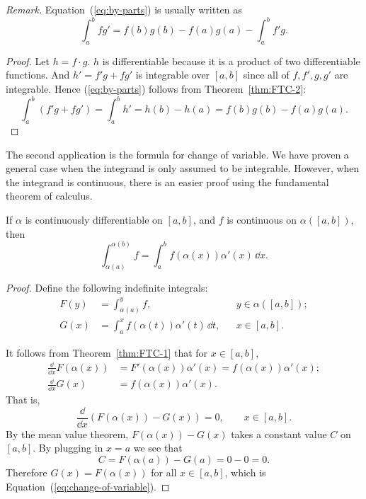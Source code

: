\noindent\textit{Remark.} Equation~(\ref{eq:by-parts}) is usually written as
\[
  \int_a^b f g' = f(b)g(b) - f(a)g(a) - \int_a^b f' g.
\]

\begin{proof}
  Let $h = f \cdot g$. $h$ is differentiable because it is a product of two differentiable functions.
  And $h' = f'g + fg'$ is integrable over $[a,b]$ since all of $f, f', g, g'$ are integrable.
  Hence (\ref{eq:by-parts}) follows from Theorem~\ref{thm:FTC-2}:
  \[
    \int_a^b (f'g + fg') = \int_a^b h' 
    = h(b) - h(a) 
    = f(b) g(b) - f(a) g(a).
  \]
\end{proof}

The second application is the formula for change of variable.
We have proven a general case when the integrand is only assumed to be integrable.
However, when the integrand is continuous, there is an easier proof using the fundamental theorem of calculus.

\begin{thm}
  If $\alpha$ is continuously differentiable on $[a,b]$, and $f$ is continuous on $\alpha([a,b])$, then
  \begin{equation}
    \label{eq:change-of-variable}
    \int_{\alpha(a)}^{\alpha(b)} f = \int_a^b f(\alpha(x)) \alpha'(x) \, \dd x.
  \end{equation}
\end{thm}

\begin{proof}
  Define the following indefinite integrals:
  \begin{align*}
    F(y) &= \int_{\alpha(a)}^y f, & & y \in \alpha([a,b]); \\
    G(x) &= \int_a^x f(\alpha(t)) \alpha'(t) \, \dd t, & & x \in [a,b].
  \end{align*}

  It follows from Theorem~\ref{thm:FTC-1} that for $x \in [a,b]$,
  \begin{align*}
    \frac{\dd}{\dd x} F(\alpha(x)) &= F'(\alpha(x)) \alpha'(x) = f(\alpha(x)) \alpha'(x); \\
    \frac{\dd}{\dd x} G(x) &= f(\alpha(x)) \alpha'(x).
  \end{align*}
  That is,
  \[
    \frac{\dd}{\dd x} (F(\alpha(x)) - G(x)) = 0, \qquad x \in [a,b].
  \]
  By the mean value theorem, $F(\alpha(x)) - G(x)$ takes a constant value $C$ on $[a,b]$.  By plugging in $x = a$ we see that 
  \[
    C = F(\alpha(a)) - G(a) = 0 - 0 = 0.
  \]
  Therefore $G(x) = F(\alpha(x))$ for all $x \in [a,b]$, which is Equation~(\ref{eq:change-of-variable}).
\end{proof}

